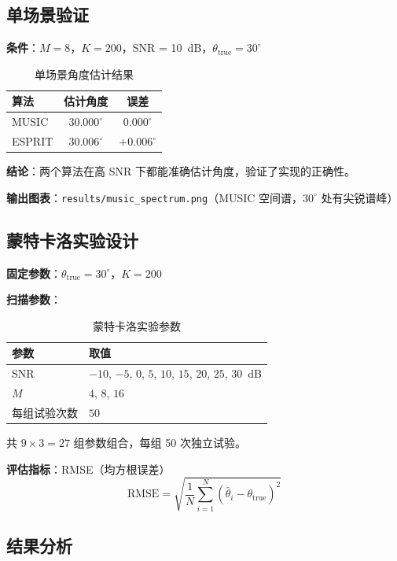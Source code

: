 \documentclass[11pt,a4paper]{article}
\newcommand{\code}[1]{\texttt{#1}}
\begin{document}
\subsection{单场景验证}

\textbf{条件}：$M=8$，$K=200$，SNR = 10~dB，$\theta_{\text{true}} = 30^\circ$

\begin{table}[H]
\centering
\caption{单场景角度估计结果}
\begin{tabular}{lcc}
\toprule
\textbf{算法} & \textbf{估计角度} & \textbf{误差} \\
\midrule
MUSIC & $30.000^\circ$ & $0.000^\circ$ \\
ESPRIT & $30.006^\circ$ & $+0.006^\circ$ \\
\bottomrule
\end{tabular}
\end{table}

\textbf{结论}：两个算法在高 SNR 下都能准确估计角度，验证了实现的正确性。

\textbf{输出图表}：\code{results/music\_spectrum.png}（MUSIC 空间谱，$30^\circ$ 处有尖锐谱峰）

\subsection{蒙特卡洛实验设计}

\textbf{固定参数}：$\theta_{\text{true}} = 30^\circ$，$K = 200$

\textbf{扫描参数}：

\begin{table}[H]
\centering
\caption{蒙特卡洛实验参数}
\begin{tabular}{ll}
\toprule
\textbf{参数} & \textbf{取值} \\
\midrule
SNR & $-10$, $-5$, $0$, $5$, $10$, $15$, $20$, $25$, $30$~dB \\
$M$ & $4$, $8$, $16$ \\
每组试验次数 & $50$ \\
\bottomrule
\end{tabular}
\end{table}

共 $9 \times 3 = 27$ 组参数组合，每组 50 次独立试验。

\textbf{评估指标}：RMSE（均方根误差）
\begin{equation}
\text{RMSE} = \sqrt{\frac{1}{N}\sum_{i=1}^{N}(\hat{\theta}_i - \theta_{\text{true}})^2}
\end{equation}

\subsection{结果分析}
\end{document}
